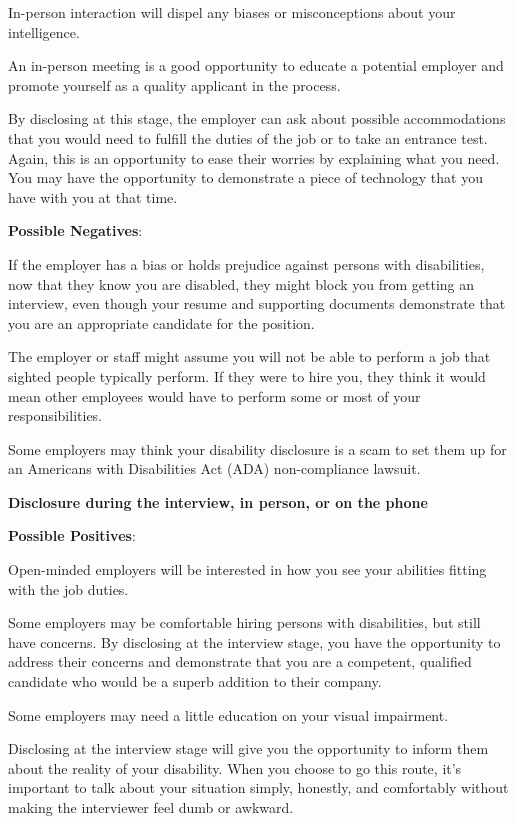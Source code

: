 In-person interaction will dispel any biases or misconceptions about your intelligence.

An in-person meeting is a good opportunity to educate a potential employer and promote yourself as a quality applicant in the process.

By disclosing at this stage, the employer can ask about possible accommodations that you would need to fulfill the duties of the job or to take an entrance test. Again, this is an opportunity to ease their worries by explaining what you need. You may have the opportunity to demonstrate a piece of technology that you have with you at that time.

\textbf{Possible Negatives}:

If the employer has a bias or holds prejudice against persons with disabilities, now that they know you are disabled, they might block you from getting an interview, even though your resume and supporting documents demonstrate that you are an appropriate candidate for the position.

The employer or staff might assume you will not be able to perform a job that sighted people typically perform. If they were to hire you, they think it would mean other employees would have to perform some or most of your responsibilities.

Some employers may think your disability disclosure is a scam to set them up for an Americans with Disabilities Act (ADA) non-compliance lawsuit.

\textbf{Disclosure during the interview, in person, or on the phone} 

\textbf{Possible Positives}:

Open-minded employers will be interested in how you see your abilities fitting with the job duties.

Some employers may be comfortable hiring persons with disabilities, but still have concerns. By disclosing at the interview stage, you have the opportunity to address their concerns and demonstrate that you are a competent, qualified candidate who would be a superb addition to their company.

Some employers may need a little education on your visual impairment.

Disclosing at the interview stage will give you the opportunity to inform them about the reality of your disability. When you choose to go this route, it's important to talk about your situation simply, honestly, and comfortably without making the interviewer feel dumb or awkward.

